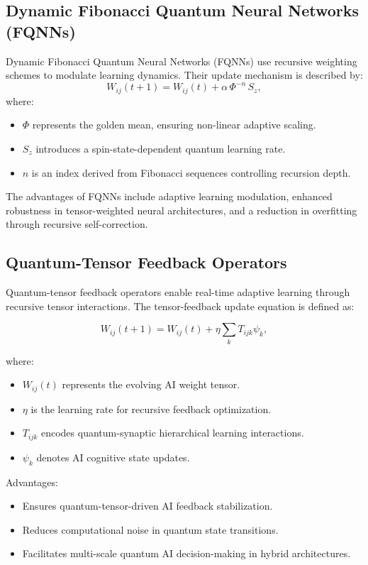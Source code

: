 \documentclass{article}
\theoremstyle{plain}
\begin{document}
\subsection{Dynamic Fibonacci Quantum Neural Networks (FQNNs)}

Dynamic Fibonacci Quantum Neural Networks (FQNNs) use recursive weighting schemes to modulate learning dynamics. Their update mechanism is described by:
\begin{equation}
W_{ij}(t+1) = W_{ij}(t) + \alpha\, \Phi^{-n}\, S_z,
\end{equation}
where:
\begin{itemize}
    \item \(\Phi\) represents the golden mean, ensuring non-linear adaptive scaling.
    \item \(S_z\) introduces a spin-state-dependent quantum learning rate.
    \item \(n\) is an index derived from Fibonacci sequences controlling recursion depth.
\end{itemize}
The advantages of FQNNs include adaptive learning modulation, enhanced robustness in tensor-weighted neural architectures, and a reduction in overfitting through recursive self-correction.
\subsection{Quantum-Tensor Feedback Operators}

Quantum-tensor feedback operators enable real-time adaptive learning through recursive tensor interactions. The tensor-feedback update equation is defined as:

\begin{equation}
W_{ij}(t+1) = W_{ij}(t) + \eta \sum_{k} T_{ijk} \psi_k,
\end{equation}

where:
\begin{itemize}
    \item $W_{ij}(t)$ represents the evolving AI weight tensor.
    \item $\eta$ is the learning rate for recursive feedback optimization.
    \item $T_{ijk}$ encodes quantum-synaptic hierarchical learning interactions.
    \item $\psi_k$ denotes AI cognitive state updates.
\end{itemize}

Advantages:
\begin{itemize}
    \item Ensures quantum-tensor-driven AI feedback stabilization.
    \item Reduces computational noise in quantum state transitions.
    \item Facilitates multi-scale quantum AI decision-making in hybrid architectures.
\end{itemize}
\end{document}

